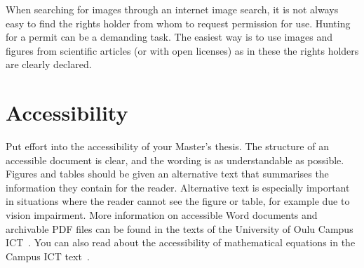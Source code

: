 When searching for images through an internet image search, it is not
always easy to find the rights holder from whom to request permission
for use. Hunting for a permit can be a demanding task. The easiest way
is to use images and figures from scientific articles (or with open licenses) as in these the
rights holders are clearly declared.

\section{Accessibility}
\label{accessibility}
Put effort into the accessibility of your Master’s thesis. The
structure of an accessible document is clear, and the wording is as
understandable as possible. Figures and tables should be given an
alternative text that summarises the information they contain for the
reader. Alternative text is especially important in situations where
the reader cannot see the figure or table, for example due to vision
impairment.  More information on accessible Word documents and
archivable PDF files can be found in the texts of the University of
Oulu Campus ICT~\cite{ictaccessibleword,ictwordpdfa}. You can also
read about the accessibility of mathematical equations in the Campus
ICT text~\cite{ictaccessiblemath}.

